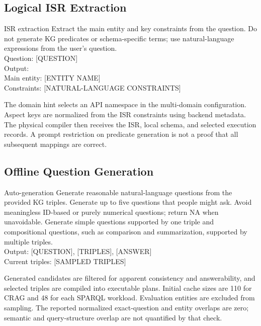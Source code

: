 \subsection{Logical ISR Extraction}
\begin{block}{ISR extraction}
Extract the main entity and key constraints from the question. Do not generate KG predicates or schema-specific terms; use natural-language expressions from the user's question.\\
Question: [QUESTION]\\
Output:\\
Main entity: [ENTITY NAME]\\
Constraints: [NATURAL-LANGUAGE CONSTRAINTS]
\end{block}
The domain hint selects an API namespace in the multi-domain configuration. Aspect keys are normalized from the ISR constraints using backend metadata. The physical compiler then receives the ISR, local schema, and selected execution records. A prompt restriction on predicate generation is not a proof that all subsequent mappings are correct.

\subsection{Offline Question Generation}
\begin{block}{Auto-generation}
Generate reasonable natural-language questions from the provided KG triples. Generate up to five questions that people might ask. Avoid meaningless ID-based or purely numerical questions; return NA when unavoidable. Generate simple questions supported by one triple and compositional questions, such as comparison and summarization, supported by multiple triples.\\
Output: [QUESTION], [TRIPLES], [ANSWER]\\
Current triples: [SAMPLED TRIPLES]
\end{block}
Generated candidates are filtered for apparent consistency and answerability, and selected triples are compiled into executable plans. Initial cache sizes are 110 for CRAG and 48 for each SPARQL workload. Evaluation entities are excluded from sampling. The reported normalized exact-question and entity overlaps are zero; semantic and query-structure overlap are not quantified by that check.


